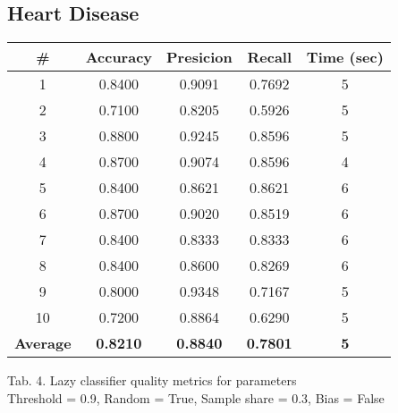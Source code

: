 \documentclass{article}
\begin{document}
\subsection{Heart Disease}

\begin{center}
    \begin{tabular}{|c|c|c|c|c|}
        \hline
        \# & \textbf{Accuracy} & \textbf{Presicion} & \textbf{Recall} & \textbf{Time (sec)} \\
        \hline
        1	& 0.8400	& 0.9091	& 0.7692	& 5 \\
        2	& 0.7100	& 0.8205	& 0.5926	& 5 \\
        3	& 0.8800	& 0.9245	& 0.8596	& 5 \\
        4	& 0.8700	& 0.9074	& 0.8596	& 4 \\
        5	& 0.8400	& 0.8621	& 0.8621	& 6 \\
        6	& 0.8700	& 0.9020	& 0.8519	& 6 \\
        7	& 0.8400	& 0.8333	& 0.8333	& 6 \\
        8	& 0.8400	& 0.8600	& 0.8269	& 6 \\
        9	& 0.8000	& 0.9348	& 0.7167	& 5 \\
        10	& 0.7200	& 0.8864	& 0.6290	& 5 \\
        \hline
        \textbf{Average} & \textbf{0.8210} & \textbf{0.8840} & \textbf{0.7801} & \textbf{5} \\
        \hline
    \end{tabular}
    
    Tab. 4. Lazy classifier quality metrics for parameters \\ Threshold = 0.9, Random = True, Sample share = 0.3, Bias = False
\end{center}
\end{document}
